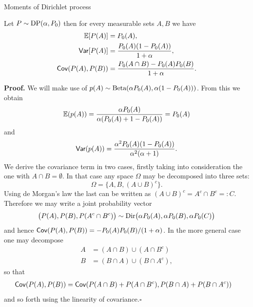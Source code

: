 \begin{frame}[allowframebreaks]{Moments of Dirichlet process}
	\begin{proposition}
Let $P\sim \text{DP}(\alpha, P_0)$ then for every measurable sets $A, B$ we have
\begin{align*}
    \mathbb{E}[ P(A)] &= P_0(A),\\
    \mathsf{Var}[P(A)] &= \frac{P_0(A)(1-P_0(A))}{1+\alpha},\\
    \mathsf{Cov}( P(A), P(B) )&=\frac{P_0(A \cap B) - P_0(A)P_0(B) }{1+\alpha}\label{Dir:Covariance}.
\end{align*}
\end{proposition}

\framebreak

\textbf{Proof.}
We will make use of  $p(A)\sim \text{Beta}(\alpha P_0(A), \alpha (1-P_0(A)))$. From this we obtain 
\begin{equation*}
    \mathbb{E} (p(A)) = \frac{\alpha P_0(A)}{\alpha( P_0(A) + 1 - P_0(A) )} = P_0(A)
\end{equation*}
and 
\begin{equation*}
    \mathsf{Var}(p(A))=\frac{\alpha^2 P_0(A)( 1-P_0(A) )}{\alpha^2 (\alpha + 1)}.
\end{equation*}
We derive the covariance term in two cases, firstly taking into consideration the one with $A\cap B = \emptyset$. In that case any space $\Omega$ may be decomposed into three sets: 
$$
\Omega = \{A, B, (A\cup B)^c\}.
$$
Using de Morgan's law the last can be written as $(A\cup B)^c = A^c\cap B^c =: C$. Therefore we may write a joint probability vector
\begin{equation*}
    \big( P(A), P(B), P(A^c\cap B^c) \big)\sim \text{Dir}\big(\alpha P_0(A), \alpha P_0(B), \alpha P_0(C) \big)
\end{equation*}
and hence $\mathsf{Cov}(P(A), P(B)) = -P_0(A)P_0(B)/(1+\alpha) $. 
In the more general case one may decompose 
\begin{align*}
    A &= (A\cap B) \cup (A\cap B^c)\\
    B &= (B\cap A)\cup (B\cap A^c),
\end{align*}
so that 
\begin{equation*}
    \begin{split}
    \mathsf{Cov} (P(A), P(B)) &= \mathsf{Cov} (P(A\cap B) +P(A\cap B^c), P(B\cap A) + P(B\cap A^c) ) 
    \end{split}
\end{equation*}
and so forth using the linearity of covariance.\hfill $\square$
\end{frame}


